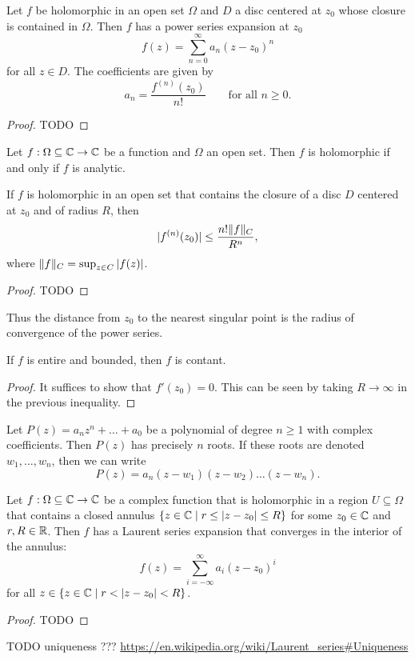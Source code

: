 \begin{proposition}
Let $f$ be holomorphic in an open set $\Omega$ and $D$ a
disc centered at $z_0$ whose closure is contained in $\Omega$. Then $f$ has a power series expansion at $z_0$
\[ f(z) = \sum_{n=0}^\infty a_n(z-z_0)^n \]
for all $z\in D$. The coefficients are given by
\[ a_n = \frac{f^{(n)}(z_0)}{n!} \qquad \text{for all $n\geq 0$}. \]
\end{proposition}
\begin{proof}
TODO
\end{proof}
\begin{corollary}
Let $f: \Omega\subseteq \mathbb{C} \to \mathbb{C}$ be a function and $\Omega$ an open set. Then $f$ is holomorphic \textup{if and only if} $f$ is analytic.
\end{corollary}
\begin{corollary}
If $f$ is holomorphic in an open
set that contains the closure of a disc $D$ centered at $z_0$ and of radius $R$,
then
\[  |f^{(n)}(z_0)| \leq \frac{n!\lVert f\rVert_C}{R^n}, \]
where $\lVert f\rVert_C = \sup_{z\in C}|f(z)|$.
\end{corollary}
\begin{proof}
TODO
\end{proof}
Thus the distance from $z_0$ to the nearest singular point is the radius of convergence of the power series.
\begin{corollary} \label{liouvilleTheoremAnalysis}
If $f$ is entire and bounded, then $f$ is contant.
\end{corollary}
\begin{proof}
It suffices to show that $f'(z_0) = 0$. This can be seen by taking $R\to\infty$ in the previous inequality.
\end{proof}
\begin{corollary}
Let $P(z) = a_nz^n + \ldots + a_0$ be a polynomial of degree $n\geq 1$ with complex coefficients. Then $P(z)$ has precisely $n$ roots. If these roots are denoted $w_1, \ldots, w_n$, then we can write
\[ P(z) = a_n(z-w_1)(z-w_2)\ldots(z-w_n). \]
\end{corollary}

\begin{proposition}
Let $f: \Omega\subseteq \mathbb{C}\to \mathbb{C}$ be a complex function that is holomorphic in a region $U\subseteq \Omega$ that contains a closed annulus $\setbuilder{z\in \C}{r\leq|z-z_0|\leq R}$ for some $z_0\in \mathbb{C}$ and $r,R\in \mathbb{R}$. Then $f$ has a Laurent series expansion that converges in the interior of the annulus:
\[ f(z) = \sum_{i=-\infty}^\infty a_i(z-z_0)^i \]
for all $z\in \setbuilder{z\in \C}{r < |z-z_0| < R}$.
\end{proposition}
\begin{proof}
TODO
\end{proof}
TODO uniqueness ??? \url{https://en.wikipedia.org/wiki/Laurent_series#Uniqueness}

